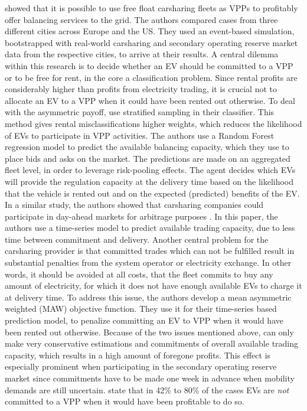 \documentclass[12pt, article]{article}
\begin{document}
\textcite{kahlen17_fleet} showed that it is possible to use free float carsharing
fleets as VPPs to profitably offer balancing services to the grid. The authors
compared cases from three different cities across Europe and the US.
They used an event-based simulation, bootstrapped with real-world carsharing
and secondary operating reserve market data from the respective cities, to
arrive at their results. A central dilemma within this research is to decide
whether an EV should be committed to a VPP or to be free for rent, in the core a
classification problem. Since rental profits are considerably higher than
profits from electricity trading, it is crucial not to allocate an EV to a VPP
when it could have been rented out otherwise. To deal with the asymmetric
payoff, \citeauthor{kahlen17_fleet} use stratified sampling in their classifier.
This method gives rental misclassifications higher weights, which reduces the
likelihood of EVs to participate in VPP activities. The authors use a Random
Forest regression model to predict the available balancing capacity, which they
use to place bids and asks on the market. The predictions are made on an
aggregated fleet level, in order to leverage risk-pooling effects. The agent
decides which EVs will provide the regulation capacity at the delivery time
based on the likelihood that the vehicle is rented out and on the expected
(predicted) benefits of the EV.
In a similar study, the authors showed that carsharing companies could
participate in day-ahead markets for arbitrage purposes
\parencite{kahlen18_elect_vehic_virtual_power_plant_dilem}. In this paper, the
authors use a time-series model to predict available trading capacity, due to
less time between commitment and delivery. Another central problem for
the carsharing provider is that committed trades which can not be fulfilled result
in substantial penalties from the system operator or electricity exchange. In
other words, it should be avoided at all costs, that the fleet commits to buy
any amount of electricity, for which it does not have enough available EVs to
charge it at delivery time. To address this issue, the authors develop a mean
asymmetric weighted (MAW) objective function. They use it for their time-series
based prediction model, to penalize committing an EV to VPP when it would have
been rented out otherwise.
Because of the two issues mentioned above,
\textcite{kahlen18_elect_vehic_virtual_power_plant_dilem} can only make very
conservative estimations and commitments of overall available trading capacity,
which results in a high amount of foregone profits. This effect is especially
prominent when participating in the secondary operating reserve market since
commitments have to be made one week in advance when mobility demands are
still uncertain. \textcite{kahlen17_fleet} state that in 42\% to 80\% of the cases
EVs are \emph{not} committed to a VPP when it would have been profitable to do so.
\end{document}
